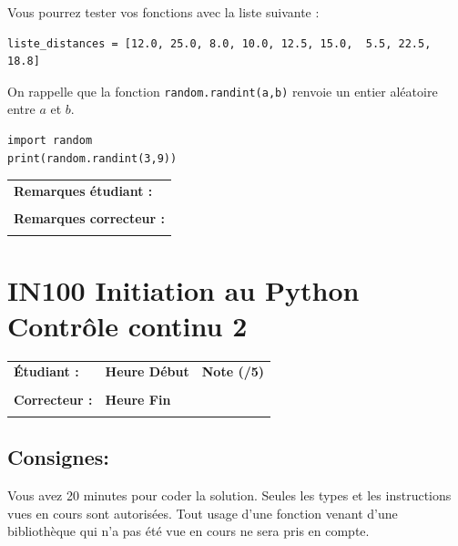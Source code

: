 \documentclass[a4paper,11pt]{article}
\begin{document}
\bigskip

Vous pourrez tester vos fonctions avec la liste suivante :
\begin{verbatim}
liste_distances = [12.0, 25.0, 8.0, 10.0, 12.5, 15.0,  5.5, 22.5, 18.8]
\end{verbatim}

On rappelle que la fonction \texttt{random.randint(a,b)} renvoie un entier aléatoire entre $a$ et $b$. 

\begin{verbatim}
import random 
print(random.randint(3,9))
\end{verbatim}


\vspace*{-0.4 cm}

\begin{table}[h!]
\centering
\renewcommand{\arraystretch}{1.4} %
\begin{tabular}{|p{15cm}|}
\hline
\textbf{Remarques étudiant :}    \\
 \\
\hline
\textbf{Remarques correcteur :}  \\
 \\
\hline
\end{tabular}
\end{table}

\newpage

\section*{\center IN100 Initiation au Python\\
Contrôle continu 2}


\begin{table}[h!]
\centering
\renewcommand{\arraystretch}{1.4} %
\begin{tabular}{|p{10cm}|p{3cm}|p{2cm}|}
\hline
\textbf{Étudiant :} & \textbf{Heure Début }  & \textbf{Note (/5) }  \\
& & \\
\hline
\textbf{Correcteur :} & \textbf{Heure Fin } & \\
& & \\
\hline

\hline
\end{tabular}
\end{table}
\vspace{-0.6 cm}
\subsection*{Consignes:} Vous avez 20 minutes pour coder la solution. Seules les types et les instructions vues en cours sont autorisées. Tout usage d'une fonction 
venant d'une bibliothèque qui n'a pas été vue en cours ne sera pris en compte. 
\end{document}

